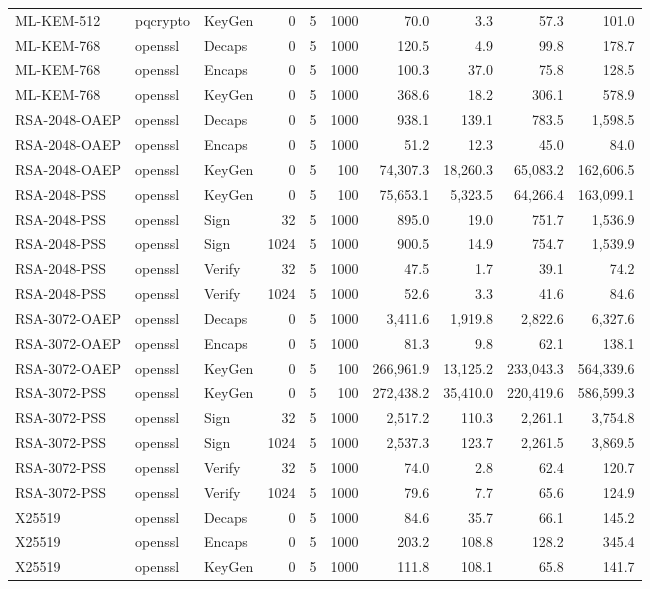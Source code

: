 \begin{table}[ht]
\begin{tabular}{@{}lllrrrrrrr@{}}
ML-KEM-512 & pqcrypto & KeyGen & 0 & 5 & 1000 & 70.0 & 3.3 & 57.3 & 101.0 \\
ML-KEM-768 & openssl & Decaps & 0 & 5 & 1000 & 120.5 & 4.9 & 99.8 & 178.7 \\
ML-KEM-768 & openssl & Encaps & 0 & 5 & 1000 & 100.3 & 37.0 & 75.8 & 128.5 \\
ML-KEM-768 & openssl & KeyGen & 0 & 5 & 1000 & 368.6 & 18.2 & 306.1 & 578.9 \\
RSA-2048-OAEP & openssl & Decaps & 0 & 5 & 1000 & 938.1 & 139.1 & 783.5 & 1,598.5 \\
RSA-2048-OAEP & openssl & Encaps & 0 & 5 & 1000 & 51.2 & 12.3 & 45.0 & 84.0 \\
RSA-2048-OAEP & openssl & KeyGen & 0 & 5 & 100 & 74,307.3 & 18,260.3 & 65,083.2 & 162,606.5 \\
RSA-2048-PSS & openssl & KeyGen & 0 & 5 & 100 & 75,653.1 & 5,323.5 & 64,266.4 & 163,099.1 \\
RSA-2048-PSS & openssl & Sign & 32 & 5 & 1000 & 895.0 & 19.0 & 751.7 & 1,536.9 \\
RSA-2048-PSS & openssl & Sign & 1024 & 5 & 1000 & 900.5 & 14.9 & 754.7 & 1,539.9 \\
RSA-2048-PSS & openssl & Verify & 32 & 5 & 1000 & 47.5 & 1.7 & 39.1 & 74.2 \\
RSA-2048-PSS & openssl & Verify & 1024 & 5 & 1000 & 52.6 & 3.3 & 41.6 & 84.6 \\
RSA-3072-OAEP & openssl & Decaps & 0 & 5 & 1000 & 3,411.6 & 1,919.8 & 2,822.6 & 6,327.6 \\
RSA-3072-OAEP & openssl & Encaps & 0 & 5 & 1000 & 81.3 & 9.8 & 62.1 & 138.1 \\
RSA-3072-OAEP & openssl & KeyGen & 0 & 5 & 100 & 266,961.9 & 13,125.2 & 233,043.3 & 564,339.6 \\
RSA-3072-PSS & openssl & KeyGen & 0 & 5 & 100 & 272,438.2 & 35,410.0 & 220,419.6 & 586,599.3 \\
RSA-3072-PSS & openssl & Sign & 32 & 5 & 1000 & 2,517.2 & 110.3 & 2,261.1 & 3,754.8 \\
RSA-3072-PSS & openssl & Sign & 1024 & 5 & 1000 & 2,537.3 & 123.7 & 2,261.5 & 3,869.5 \\
RSA-3072-PSS & openssl & Verify & 32 & 5 & 1000 & 74.0 & 2.8 & 62.4 & 120.7 \\
RSA-3072-PSS & openssl & Verify & 1024 & 5 & 1000 & 79.6 & 7.7 & 65.6 & 124.9 \\
X25519 & openssl & Decaps & 0 & 5 & 1000 & 84.6 & 35.7 & 66.1 & 145.2 \\
X25519 & openssl & Encaps & 0 & 5 & 1000 & 203.2 & 108.8 & 128.2 & 345.4 \\
X25519 & openssl & KeyGen & 0 & 5 & 1000 & 111.8 & 108.1 & 65.8 & 141.7 \\
\bottomrule
\end{tabular}
\end{table}
